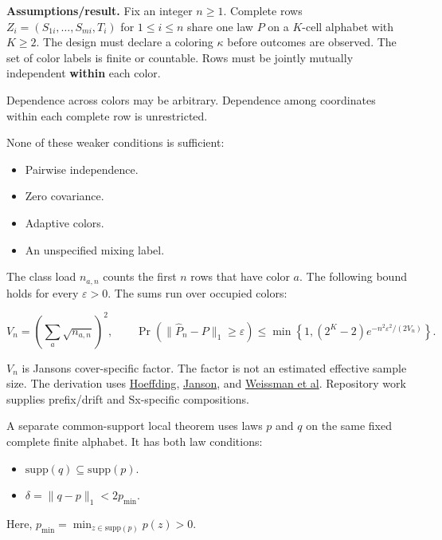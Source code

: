 \documentclass[
  11pt,
  a4paper,
]{article}
\providecommand{\tightlist}{%
  \setlength{\itemsep}{0pt}\setlength{\parskip}{0pt}}
\begin{document}
\textbf{Assumptions/result.} Fix an integer \(n\ge1\). Complete rows
\(Z_i=(S_{1i},\ldots,S_{mi},T_i)\) for \(1\le i\le n\) share one law
\(P\) on a \(K\)-cell alphabet with \(K\ge2\). The design must declare a
coloring \(\kappa\) before outcomes are observed. The set of color
labels is finite or countable. Rows must be jointly mutually independent
\textbf{within} each color.

Dependence across colors may be arbitrary. Dependence among coordinates
within each complete row is unrestricted.

None of these weaker conditions is sufficient:

\begin{itemize}
\tightlist
\item
  Pairwise independence.
\item
  Zero covariance.
\item
  Adaptive colors.
\item
  An unspecified mixing label.
\end{itemize}

The class load \(n_{a,n}\) counts the first \(n\) rows that have color
\(a\). The following bound holds for every \(\varepsilon>0\). The sums
run over occupied colors:

\[
V_n=\left(\sum_a\sqrt{n_{a,n}}\right)^2,
\qquad
\Pr(\lVert\widehat P_n-P\rVert_1\ge\varepsilon)
\le\min\left\{1,(2^K-2)e^{-n^2\varepsilon^2/(2V_n)}\right\}.
\]

\(V_n\) is Janson\textquotesingle s cover-specific factor. The factor is
not an estimated effective sample size. The derivation uses
\href{https://doi.org/10.1080/01621459.1963.10500830}{Hoeffding},
\href{https://doi.org/10.1002/rsa.20008}{Janson}, and
\href{https://shiftleft.com/mirrors/www.hpl.hp.com/techreports/2003/HPL-2003-97R1.pdf}{Weissman
et al}. Repository work supplies prefix/drift and Sx-specific
compositions.

A separate common-support local theorem uses laws \(p\) and \(q\) on the
same fixed complete finite alphabet. It has both law conditions:

\begin{itemize}
\tightlist
\item
  \(\mathrm{supp}(q)\subseteq\mathrm{supp}(p)\).
\item
  \(\delta=\lVert q-p\rVert_1<2p_{\min}\).
\end{itemize}

Here, \(p_{\min}=\min_{z\in\mathrm{supp}(p)}p(z)>0\).
\end{document}
